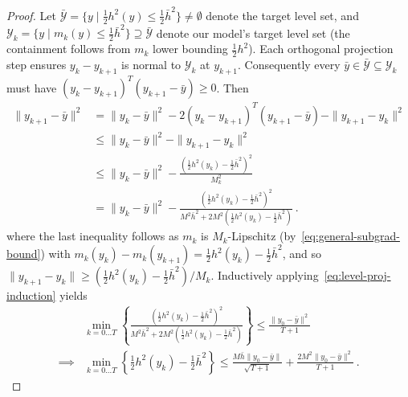 \documentclass[10pt,a4paper]{amsart}
\begin{document}
\begin{proof}
Let $\mathcal{\bar Y} = \{y \mid \frac{1}{2}h^2(y) \leq \frac{1}{2}\bar h^2\}\neq\emptyset$ denote the target level set, and $\mathcal{Y}_k = \{y \mid m_k(y)\leq \frac{1}{2}\bar h^2\}\supseteq \mathcal{\bar Y}$ denote our model's target level set (the containment follows from $m_k$ lower bounding $\frac{1}{2}h^2$). Each orthogonal projection step ensures $y_{k}-y_{k+1}$ is normal to $\mathcal{Y}_k$ at $y_{k+1}$. Consequently every $\bar y\in \mathcal{\bar Y}\subseteq\mathcal{Y}_k$ must have $(y_k - y_{k+1})^T(y_{k+1}-\bar y)\geq 0$. Then
\begin{align}
    \|y_{k+1}-\bar y\|^2 &= \|y_k - \bar y\|^2  -  2(y_{k} - y_{k+1})^T(y_{k+1}-\bar y) - \|y_{k+1}-y_k\|^2 \nonumber \\
    &\leq \|y_k - \bar y\|^2 - \|y_{k+1}-y_k\|^2 \nonumber \\
    &\leq \|y_k - \bar y\|^2 - \frac{\left(\frac{1}{2}h^2(y_k) - \frac{1}{2}\bar h^2\right)^2}{M^2_k} \nonumber  \\
    &= \|y_k - \bar y\|^2 - \frac{\left(\frac{1}{2}h^2(y_k) - \frac{1}{2}\bar h^2\right)^2}{M^2\bar h^2 + 2M^2\left(\frac{1}{2}h^2(y_k) - \frac{1}{2}\bar h^2\right)} \ . \label{eq:level-proj-induction}
\end{align}
where the last inequality follows as $m_k$ is $M_k$-Lipschitz (by~\eqref{eq:general-subgrad-bound}) with $m_k(y_k)-m_k(y_{k+1}) = \frac{1}{2}h^2(y_k) - \frac{1}{2}\bar h^2$, and so $\|y_{k+1}-y_k\| \geq (\frac{1}{2}h^2(y_k) - \frac{1}{2}\bar h^2)/M_k$. Inductively applying~\eqref{eq:level-proj-induction} yields
\begin{align*}
    & \min_{k=0\dots T}\left\{\frac{\left(\frac{1}{2}h^2(y_k) - \frac{1}{2}\bar h^2\right)^2}{M^2\bar h^2 + 2M^2\left(\frac{1}{2}h^2(y_k) - \frac{1}{2}\bar h^2\right)}\right\} \leq \frac{\|y_0-\bar y\|^2}{T+1} \\
    \implies & \min_{k=0\dots T}\left\{\frac{1}{2}h^2(y_k) - \frac{1}{2}\bar h^2\right\} \leq \frac{M\bar h\|y_0-\bar y\|}{\sqrt{T+1}} + \frac{2M^2\|y_0-\bar y\|^2}{T+1} \ . 
\end{align*}


\end{proof}
\end{document}
